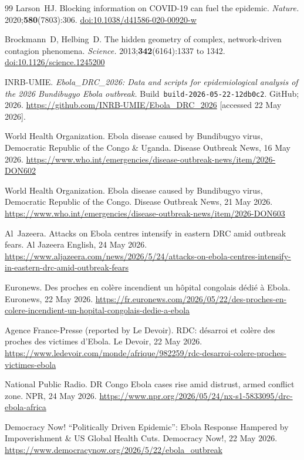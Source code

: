 \documentclass[12pt,a4paper]{article}
\begin{document}
\begin{thebibliography}{99}
Larson~HJ.
Blocking information on COVID-19 can fuel the epidemic.
\textit{Nature.} 2020;\textbf{580}(7803):306.
\href{https://doi.org/10.1038/d41586-020-00920-w}{doi:10.1038/d41586-020-00920-w}

Brockmann~D, Helbing~D.
The hidden geometry of complex, network-driven contagion phenomena.
\textit{Science.} 2013;\textbf{342}(6164):1337 to 1342.
\href{https://doi.org/10.1126/science.1245200}{doi:10.1126/science.1245200}

INRB-UMIE.
\textit{Ebola\_DRC\_2026: Data and scripts for epidemiological analysis of
the 2026 Bundibugyo Ebola outbreak.}
Build~\texttt{build-2026-05-22-12db0c2}. GitHub; 2026.
\url{https://github.com/INRB-UMIE/Ebola_DRC_2026}
[accessed 22 May 2026].

World Health Organization.
Ebola disease caused by Bundibugyo virus, Democratic Republic of the Congo
\& Uganda. Disease Outbreak News, 16 May 2026.
\url{https://www.who.int/emergencies/disease-outbreak-news/item/2026-DON602}

World Health Organization.
Ebola disease caused by Bundibugyo virus, Democratic Republic of the Congo.
Disease Outbreak News, 21 May 2026.
\url{https://www.who.int/emergencies/disease-outbreak-news/item/2026-DON603}

Al~Jazeera.
Attacks on Ebola centres intensify in eastern DRC amid outbreak fears.
Al Jazeera English, 24 May 2026.
\url{https://www.aljazeera.com/news/2026/5/24/attacks-on-ebola-centres-intensify-in-eastern-drc-amid-outbreak-fears}

Euronews.
Des proches en col\`ere incendient un h\^opital congolais d\'edi\'e
\`a Ebola.
Euronews, 22 May 2026.
\url{https://fr.euronews.com/2026/05/22/des-proches-en-colere-incendient-un-hopital-congolais-dedie-a-ebola}

Agence France-Presse (reported by Le Devoir).
RDC: d\'esarroi et col\`ere des proches des victimes d'Ebola.
Le Devoir, 22 May 2026.
\url{https://www.ledevoir.com/monde/afrique/982259/rdc-desarroi-colere-proches-victimes-ebola}

National Public Radio.
DR Congo Ebola cases rise amid distrust, armed conflict zone.
NPR, 24 May 2026.
\url{https://www.npr.org/2026/05/24/nx-s1-5833095/drc-ebola-africa}

Democracy Now!
``Politically Driven Epidemic'': Ebola Response Hampered by Impoverishment
\& US Global Health Cuts.
Democracy Now!, 22 May 2026.
\url{https://www.democracynow.org/2026/5/22/ebola_outbreak}


\end{thebibliography}
\end{document}
